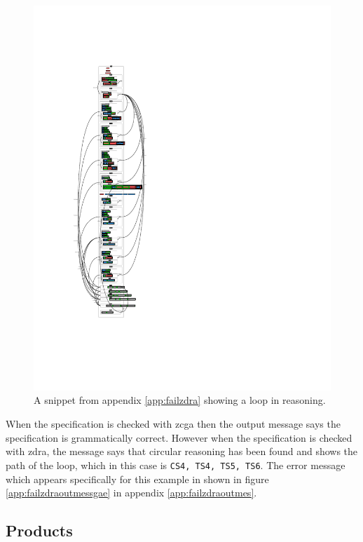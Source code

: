 \begin{figure}[H]
\includegraphics[clip, trim=0cm 10cm 6cm 11cm, scale=1.3]{examples/nonworkzdra/1n2.pdf}
\caption{A snippet from appendix \ref{app:failzdra} showing a loop in reasoning. \label{fig:zdraloopsnippet}}
\end{figure}

When the specification is checked with \gls{zcga} then the output message says the specification is grammatically correct. However when the specification is checked with \gls{zdra}, the message says that circular reasoning has been found and shows the path of the loop, which in this case is \verb|CS4, TS4, TS5, TS6|. The error message which appears specifically for this example in shown in figure \ref{app:failzdraoutmessgae} in appendix \ref{app:failzdraoutmes}.

\subsection{Products}
\label{subsec:zdra_prodcuts}

